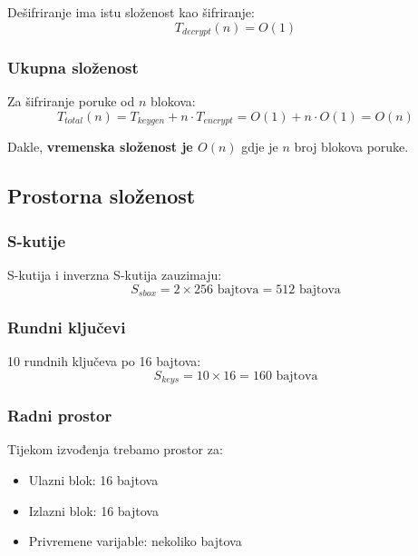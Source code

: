 \documentclass[12pt,a4paper]{article}
\begin{document}
Dešifriranje ima istu složenost kao šifriranje:
\begin{equation}
    T_{decrypt}(n) = O(1)
\end{equation}

\subsubsection{Ukupna složenost}

Za šifriranje poruke od $n$ blokova:
\begin{equation}
    T_{total}(n) = T_{keygen} + n \cdot T_{encrypt} = O(1) + n \cdot O(1) = O(n)
\end{equation}

Dakle, \textbf{vremenska složenost je $O(n)$} gdje je $n$ broj blokova poruke.

\newpage
\subsection{Prostorna složenost}

\subsubsection{S-kutije}

S-kutija i inverzna S-kutija zauzimaju:
\begin{equation}
    S_{sbox} = 2 \times 256 \text{ bajtova} = 512 \text{ bajtova}
\end{equation}

\subsubsection{Rundni ključevi}

10 rundnih ključeva po 16 bajtova:
\begin{equation}
    S_{keys} = 10 \times 16 = 160 \text{ bajtova}
\end{equation}

\subsubsection{Radni prostor}

Tijekom izvođenja trebamo prostor za:
\begin{itemize}
    \item Ulazni blok: 16 bajtova
    \item Izlazni blok: 16 bajtova
    \item Privremene varijable: nekoliko bajtova
\end{itemize}
\end{document}
